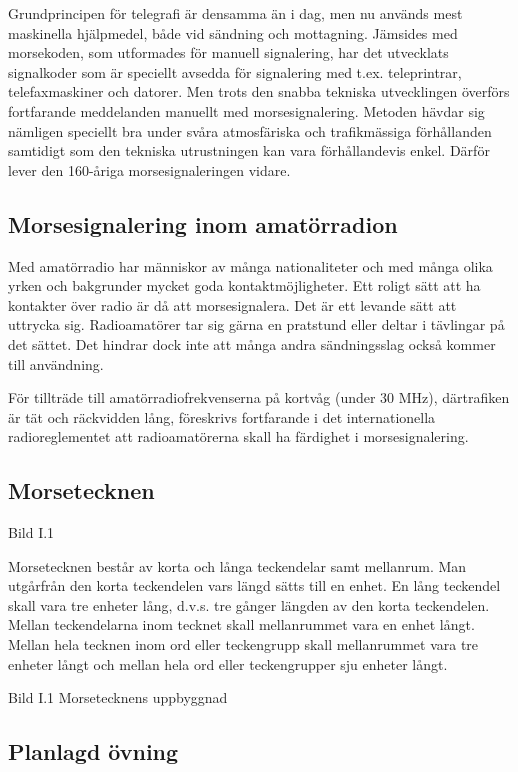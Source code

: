 \documentclass[a4paper,twoside,twocolumn,openright]{book}
\begin{document}
Grundprincipen för telegrafi är densamma än i dag, men nu används mest maskinella
hjälpmedel, både vid sändning och mottagning. Jämsides med morsekoden, som utformades för
manuell signalering, har det utvecklats signalkoder som är speciellt avsedda för
signalering med t.ex. teleprintrar, telefaxmaskiner och datorer. Men trots den snabba
tekniska utvecklingen överförs fortfarande meddelanden manuellt med morsesignalering.
Metoden hävdar sig nämligen speciellt bra under svåra atmosfäriska och trafikmässiga
förhållanden samtidigt som den tekniska utrustningen kan vara förhållandevis enkel.
Därför lever den 160-åriga morsesignaleringen vidare.

\subsection{Morsesignalering inom amatörradion}

Med amatörradio har människor av många nationaliteter och med många olika yrken
och bakgrunder mycket goda kontaktmöjligheter. Ett roligt sätt att ha kontakter över
radio är då att morsesignalera. Det är ett levande sätt att uttrycka sig. Radioamatörer
tar sig gärna en pratstund eller deltar i tävlingar på det sättet. Det hindrar dock inte
att många andra sändningsslag också kommer till användning.

För tillträde till amatörradiofrekvenserna på kortvåg (under 30 MHz), därtrafiken är tät
och räckvidden lång, föreskrivs fortfarande i det internationella radioreglementet att
radioamatörerna skall ha färdighet i morsesignalering.

\subsection{Morsetecknen}
Bild I.1

Morsetecknen består av korta och långa teckendelar samt mellanrum. Man utgårfrån
den korta teckendelen vars längd sätts till en enhet. En lång teckendel skall vara tre
enheter lång, d.v.s. tre gånger längden av den korta teckendelen. Mellan teckendelarna
inom tecknet skall mellanrummet vara en enhet långt. Mellan hela tecknen inom ord
eller teckengrupp skall mellanrummet vara tre enheter långt och mellan hela ord eller
teckengrupper sju enheter långt.


Bild I.1 Morsetecknens uppbyggnad

\subsection{Planlagd övning}
\end{document}
